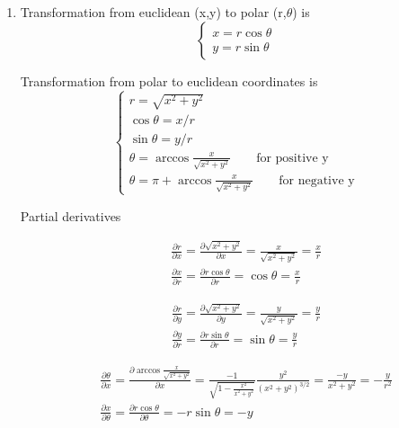 \documentclass[12pt,a4paper]{article}
\begin{document}
\begin{enumerate}
\item

Transformation from euclidean (x,y) to polar (r,$\theta$) is
\begin{equation*}
	\begin{cases}
	x= r\cos\theta \\
	y= r\sin\theta
	\end{cases}
\end{equation*}

Transformation from polar to euclidean coordinates is
\begin{equation*}
	\begin{cases}
	r= \sqrt{x^2 + y^2} \\
	\cos\theta= x/r \\
	\sin\theta=y/r \\
	\theta = \arccos{\frac{x}{\sqrt{x^2+y^2}}} \qquad \text{for positive y} \\
	\theta = \pi + \arccos{\frac{x}{\sqrt{x^2+y^2}}} \qquad \text{for negative y}
	\end{cases}
\end{equation*}

Partial derivatives

\begin{eqnarray*}
&&\frac{\partial r}{\partial x} = \frac{\partial{\sqrt{x^2 + y^2}}}{\partial x} = \frac{ x }{ \sqrt{x^2 + y^2} } = \frac x r \\
&& \frac{ \partial x }{ \partial r } = \frac{ \partial r\cos\theta }{ \partial r } = \cos\theta = \frac x r
\end{eqnarray*}

\begin{eqnarray*}
&&\frac{ \partial r }{ \partial y } = \frac{\partial \sqrt{x^2 + y^2} }{ \partial y } = \frac{ y }{ \sqrt{x^2 + y^2} } = \frac y r \\
&&\frac{ \partial y }{ \partial r } = \frac{ \partial r\sin\theta }{ \partial r } = \sin\theta = \frac{y}{r}
\end{eqnarray*}

\begin{eqnarray*}
&& \frac{ \partial\theta }{ \partial x } = \frac{ \partial\arccos{\frac{x}{\sqrt{x^2+y^2}} } }{ \partial x } = \frac{-1}{\sqrt{1 - \frac{x^2}{x^2+y^2} }} \frac{y^2}{(x^2+y^2)^{3/2}} = \frac{-y}{x^2+y^2} = -\frac{y}{r^2} \\
&& \frac{\partial x}{\partial \theta} = \frac{\partial r\cos\theta}{\partial \theta} = -r\sin\theta = -y
\end{eqnarray*}
{\color{red}{Page 432 equation 11.23?}}



\end{enumerate}
\end{document}
